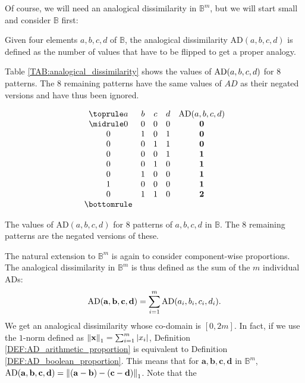 Of course, we will need an analogical dissimilarity in $\mathbb{B}^m$, but we
will start small and consider $\mathbb{B}$ first:
\begin{definition}
  \label{DEF:AD_boolean_proportion}
  Given four elements $a, b, c, d$ of $\mathbb{B}$, the analogical
  dissimilarity $\text{AD}(a, b, c, d)$ is defined as the number of values that
  have to be flipped to get a proper analogy.
\end{definition}
\noindent
Table \ref{TAB:analogical_dissimilarity} shows the values of $\AD(a, b, c, d)$
for 8 patterns. The $8$ remaining patterns have the same values of $AD$ as
their negated versions and have thus been ignored.
\begin{table}[t]
  \centering
  $$
  \begin{array}{ccccc}
    \toprule
    a & b & c & d &  \AD(a, b, c, d)\\
    \midrule
    0 & 0 & 0 & 0 &   \textbf{0}\\
    0 & 1 & 0 & 1 &   \textbf{0}\\
    0 & 0 & 1 & 1 &   \textbf{0}\\
    0 & 0 & 0 & 1 &   \textbf{1}\\
    0 & 0 & 1 & 0 &   \textbf{1}\\
    0 & 1 & 0 & 0 &   \textbf{1}\\
    1 & 0 & 0 & 0 &   \textbf{1}\\
    0 & 1 & 1 & 0 &   \textbf{2}\\
    \bottomrule
  \end{array}
  $$
  \caption{The values of $\text{AD}(a, b, c,d)$ for $8$ patterns of $a, b, c,
  d$ in $\mathbb{B}$. The $8$ remaining patterns are the negated versions of
  these.}
  \label{TAB:analogical_dissimilarity}
\end{table}
The natural extension to $\mathbb{B}^m$ is again to consider component-wise
proportions. The analogical dissimilarity in $\mathbb{B}^m$ is thus defined as
the sum of the $m$ individual ADs:
$$\AD(\mathbf{a}, \mathbf{b},\mathbf{c},\mathbf{d}) = \sum\limits_{i=1}^m
\AD(a_i,b_i,c_i,d_i).$$
We get an analogical dissimilarity whose co-domain is $[0, 2m]$. In fact, if we
use the $1$-norm defined as $\norm{1}{\mathbf{x}} = \sum_{i = 1}^m |x_i|$,
Definition \ref{DEF:AD_arithmetic_proportion} is equivalent to Definition
\ref{DEF:AD_boolean_proportion}. This means that for $\mathbf{a},
\mathbf{b},\mathbf{c},\mathbf{d}$ in $\mathbb{B}^m$, $\AD(\mathbf{a},
\mathbf{b},\mathbf{c},\mathbf{d}) =
\norm{1}{(\mathbf{a}-\mathbf{b})-(\mathbf{c}-\mathbf{d})}$. Note that the
